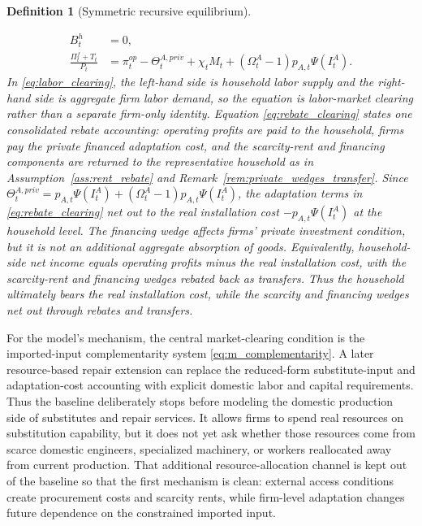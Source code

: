 ﻿\documentclass[12pt]{article}
\newtheorem{definition}{Definition}
\theoremstyle{remark}
\begin{document}
\begin{definition}[Symmetric recursive equilibrium]
\begin{enumerate}[leftmargin=1.5em]
\begin{align}
        B_t^h&=0,
        \label{eq:bond_clearing}\\
        \frac{\Pi_t^f+T_t}{P_t}
        &=
        \pi_t^{op}
        -
        \Theta_t^{A,priv}
        +
        \chi_tM_t
        +
        (\Omega_t^A-1)p_{A,t}\Psi(I_t^A).
        \label{eq:rebate_clearing}
    \end{align}
    In \eqref{eq:labor_clearing}, the left-hand side is household labor supply and the right-hand
    side is aggregate firm labor demand, so the equation is labor-market clearing rather than a
    separate firm-only identity. Equation \eqref{eq:rebate_clearing} states one
    consolidated rebate accounting: operating profits are paid to the household, firms pay the
    private financed adaptation cost, and the scarcity-rent and financing components are returned
    to the representative household as in Assumption~\ref{ass:rent_rebate} and
    Remark~\ref{rem:private_wedges_transfer}. Since
    $\Theta_t^{A,priv}=p_{A,t}\Psi(I_t^A)+(\Omega_t^A-1)p_{A,t}\Psi(I_t^A)$, the adaptation terms
    in \eqref{eq:rebate_clearing} net out to the real installation cost
    $-p_{A,t}\Psi(I_t^A)$ at the household level. The financing wedge affects firms' private
    investment condition, but it is not an additional aggregate absorption of goods.
    Equivalently, household-side net income equals operating profits minus the real installation
    cost, with the scarcity-rent and financing wedges rebated back as transfers. Thus the household
    ultimately bears the real installation cost, while the scarcity and financing wedges net out
    through rebates and transfers.
\end{enumerate}
\end{definition}

For the model's mechanism, the central market-clearing condition is the imported-input
complementarity system \eqref{eq:m_complementarity}. A later resource-based repair extension can
replace the reduced-form substitute-input and adaptation-cost accounting with explicit domestic
labor and capital requirements. Thus the baseline deliberately stops before modeling the domestic
production side of substitutes and repair services. It allows firms to spend real resources on
substitution capability, but it does not yet ask whether those resources come from scarce domestic
engineers, specialized machinery, or workers reallocated away from current production. That
additional resource-allocation channel is kept out of the baseline so that the first mechanism is
clean: external access conditions create procurement costs and scarcity rents, while firm-level
adaptation changes future dependence on the constrained imported input.
\end{document}
